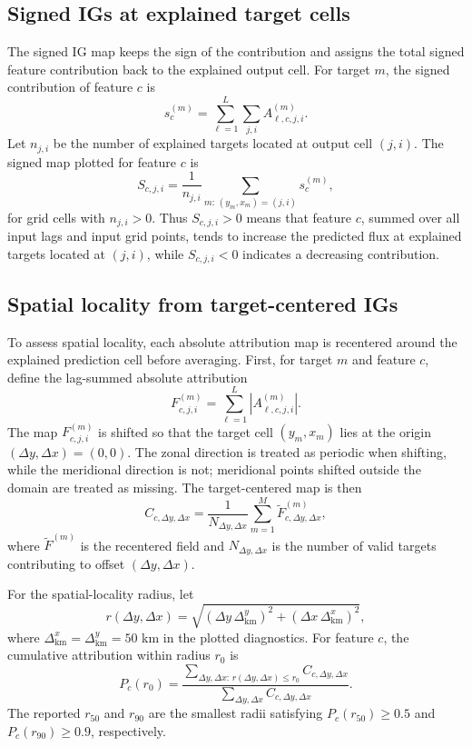 \subsection{Signed IGs at explained target cells}
\label{app:signed-igs-targets}

The signed IG map keeps the sign of the contribution and assigns the total signed feature contribution back to the explained output cell. For target \(m\), the signed contribution of feature \(c\) is
\[
s^{(m)}_{c}
=
\sum_{\ell=1}^{L}\sum_{j,i} A^{(m)}_{\ell,c,j,i}.
\]
Let \(n_{j,i}\) be the number of explained targets located at output cell \((j,i)\). The signed map plotted for feature \(c\) is
\[
S_{c,j,i}
=
\frac{1}{n_{j,i}}
\sum_{m:\,(y_m,x_m)=(j,i)} s^{(m)}_{c},
\]
for grid cells with \(n_{j,i}>0\). Thus \(S_{c,j,i}>0\) means that feature \(c\), summed over all input lags and input grid points, tends to increase the predicted flux at explained targets located at \((j,i)\), while \(S_{c,j,i}<0\) indicates a decreasing contribution.

\subsection{Spatial locality from target-centered IGs}
\label{app:spatial-locality-target-centered}

To assess spatial locality, each absolute attribution map is recentered around the explained prediction cell before averaging. First, for target \(m\) and feature \(c\), define the lag-summed absolute attribution
\[
F^{(m)}_{c,j,i}
=
\sum_{\ell=1}^{L}\left|A^{(m)}_{\ell,c,j,i}\right| .
\]
The map \(F^{(m)}_{c,j,i}\) is shifted so that the target cell \((y_m,x_m)\) lies at the origin \((\Delta y,\Delta x)=(0,0)\). The zonal direction is treated as periodic when shifting, while the meridional direction is not; meridional points shifted outside the domain are treated as missing. The target-centered map is then
\[
C_{c,\Delta y,\Delta x}
=
\frac{1}{N_{\Delta y,\Delta x}}
\sum_{m=1}^{M}
\widetilde{F}^{(m)}_{c,\Delta y,\Delta x},
\]
where \(\widetilde{F}^{(m)}\) is the recentered field and \(N_{\Delta y,\Delta x}\) is the number of valid targets contributing to offset \((\Delta y,\Delta x)\).

For the spatial-locality radius, let
\[
r(\Delta y,\Delta x)
=
\sqrt{(\Delta y\,\Delta_{\mathrm{km}}^{y})^2
+(\Delta x\,\Delta_{\mathrm{km}}^{x})^2},
\]
where \(\Delta_{\mathrm{km}}^{x}=\Delta_{\mathrm{km}}^{y}=50\) km in the plotted diagnostics. For feature \(c\), the cumulative attribution within radius \(r_0\) is
\[
P_c(r_0)
=
\frac{
\sum_{\Delta y,\Delta x:\,r(\Delta y,\Delta x)\le r_0}
C_{c,\Delta y,\Delta x}
}{
\sum_{\Delta y,\Delta x} C_{c,\Delta y,\Delta x}
}.
\]
The reported \(r_{50}\) and \(r_{90}\) are the smallest radii satisfying \(P_c(r_{50})\ge 0.5\) and \(P_c(r_{90})\ge 0.9\), respectively.

